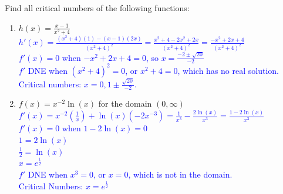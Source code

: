\documentclass{ximera}
\begin{document}
\begin{exercise}
    Find all critical numbers of the following functions: 
    \begin{enumerate}
        
        \item $h(x)=\frac{x-1}{x^2+4}$\\
        \textcolor{blue}{ $h'(x)=\frac{(x^2+4)(1)-(x-1)(2x)}{(x^2+4)^2}=\frac{x^2+4-2x^2+2x}{(x^2+4)^2}=\frac{-x^2+2x+4}{(x^2+4)^2}$\\
        $f'(x)=0$ when $-x^2+2x+4=0$, so $x=\frac{-2\pm\sqrt{20}}{-2}$\\
        $f'$ DNE when $(x^2+4)^2=0$, or $x^2+4=0$, which has no real solution.\\
        Critical numbers: $x=0,1\pm\frac{\sqrt{20}}{-2} $.}
        
        \item $f(x)=x^{-2}\ln(x)$ for the domain $(0,\infty)$\\
        \textcolor{blue}{$f'(x)=x^{-2}(\frac{1}{x})+\ln(x)(-2x^{-3})=\frac{1}{x^3}-\frac{2\ln(x)}{x^3}=\frac{1-2\ln(x)}{x^3}$\\
        $f'(x)=0$ when $1-2\ln(x)=0$\\
        $1=2\ln(x)$\\
        $\frac{1}{2}=\ln(x)$\\
        $x=e^{\frac{1}{2}}$\\
        $f'$ DNE when $x^3=0$, or $x=0$, which is not in the domain.\\
        Critical Numbers: $x=e^{\frac{1}{2}}$}     
    \end{enumerate}
\end{exercise}
\end{document}
